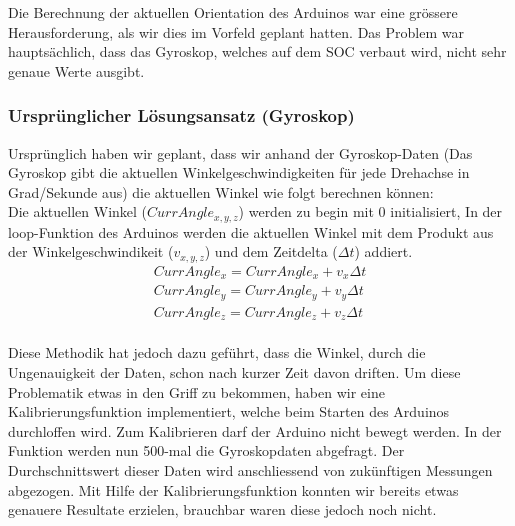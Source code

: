 
Die Berechnung der aktuellen Orientation des Arduinos war eine grössere Herausforderung,
als wir dies im Vorfeld geplant hatten. Das Problem war hauptsächlich, dass das Gyroskop, welches auf dem SOC verbaut wird, nicht sehr genaue Werte ausgibt.

\subsubsection{Ursprünglicher Lösungsansatz (Gyroskop)}
Ursprünglich haben wir geplant, dass wir anhand der Gyroskop-Daten 
(Das Gyroskop gibt die aktuellen Winkelgeschwindigkeiten für jede Drehachse in Grad/Sekunde aus) 
die aktuellen Winkel wie folgt berechnen können:\\

Die aktuellen Winkel (\begin{math}CurrAngle_{x,y,z}\end{math}) werden zu begin mit 0 initialisiert, In der loop-Funktion des Arduinos werden die aktuellen Winkel mit dem Produkt aus der Winkelgeschwindikeit (\begin{math}v_{x,y,z}\end{math}) und dem Zeitdelta (\begin{math}\Delta{t}\end{math}) addiert.\\

\begin{gather*}
  CurrAngle_x = CurrAngle_x + v_x \Delta t  \\
  CurrAngle_y = CurrAngle_y + v_y \Delta t  \\
  CurrAngle_z = CurrAngle_z + v_z \Delta t  \\
\end{gather*}

Diese Methodik hat jedoch dazu geführt, dass die Winkel, durch die Ungenauigkeit der Daten, schon nach kurzer Zeit davon driften.
Um diese Problematik etwas in den Griff zu bekommen, haben wir eine Kalibrierungsfunktion implementiert, welche beim Starten des Arduinos durchloffen wird.
Zum Kalibrieren darf der Arduino nicht bewegt werden. In der Funktion werden nun 500-mal die Gyroskopdaten abgefragt.
Der Durchschnittswert dieser Daten wird anschliessend von zukünftigen Messungen abgezogen.
Mit Hilfe der Kalibrierungsfunktion konnten wir bereits etwas genauere Resultate erzielen, brauchbar waren diese jedoch  noch nicht.

\newpage

